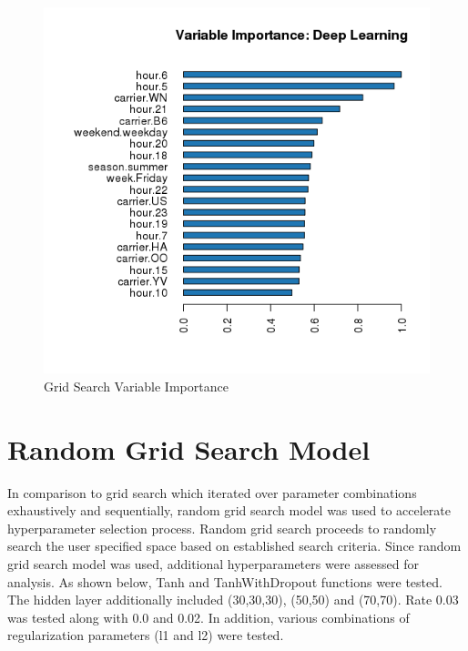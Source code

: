 \documentclass[12pt,twoside]{amherstthesis}
\begin{document}
  \begin{figure}[htbp]
  \centering
  \includegraphics[scale = 1,angle = 0]{figure/VarModGrid.png}
  \caption[Grid Search Variable Importance]{\normalsize{Grid Search Variable Importance}}
  \label{fig:Hyarn89}
  \end{figure}
  
  \clearpage 
  
  \section{Random Grid Search Model}\label{random-grid-search-model}
  
  In comparison to grid search which iterated over parameter combinations
  exhaustively and sequentially, random grid search model was used to
  accelerate hyperparameter selection process. Random grid search proceeds
  to randomly search the user specified space based on established search
  criteria. Since random grid search model was used, additional
  hyperparameters were assessed for analysis. As shown below, Tanh and
  TanhWithDropout functions were tested. The hidden layer additionally
  included (30,30,30), (50,50) and (70,70). Rate 0.03 was tested along
  with 0.0 and 0.02. In addition, various combinations of regularization
  parameters (l1 and l2) were tested.
  
\end{document}
